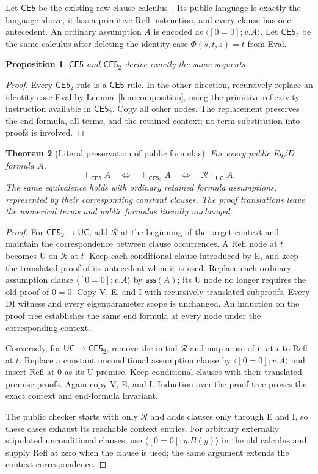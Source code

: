 \documentclass[11pt,letterpaper]{article}
\newtheorem{theorem}{Theorem}[section]
\newtheorem{proposition}[theorem]{Proposition}
\theoremstyle{definition}\newtheorem{definition}[theorem]{Definition}
\newcommand{\UC}{\mathsf{UC}}
\newcommand{\CE}{\mathsf{CE5}}
\newcommand{\CEtwo}{\mathsf{CE5}_2}
\newcommand{\cl}[2]{\langle #1;#2\rangle}
\newcommand{\ass}[1]{\mathsf{ass}(#1)}
\begin{document}
Let $\CE$ be the existing raw clause calculus~\cite{raw}. Its public
language is exactly the language above, it has a primitive Refl instruction,
and every clause has one antecedent. An ordinary assumption $A$ is encoded
as $\cl{[0=0]}{v.A}$. Let $\CEtwo$ be the same calculus after deleting
the identity case $\Phi(s,t,s)=t$ from Eval.

\begin{proposition}
$\CE$ and $\CEtwo$ derive exactly the same sequents.
\end{proposition}
\begin{proof}
Every $\CEtwo$ rule is a $\CE$ rule. In the other direction, recursively
replace an identity-case Eval by Lemma~\ref{lem:composition}, using the
primitive reflexivity instruction available in $\CEtwo$. Copy all other
nodes. The replacement preserves the end formula, all terms, and the
retained context; no term substitution into proofs is involved.
\end{proof}

\begin{theorem}[Literal preservation of public formulas]
\label{thm:local}
For every public Eq/$D$ formula $A$,
\[
 \vdash_{\CE}A\quad\Longleftrightarrow\quad
 \vdash_{\CEtwo}A\quad\Longleftrightarrow\quad
 \mathcal R\vdash_{\UC}A.
\]
The same equivalence holds with ordinary retained formula assumptions,
represented by their corresponding constant clauses. The proof translations
leave the numerical terms and public formulas literally unchanged.
\end{theorem}
\begin{proof}
For $\CEtwo\to\UC$, add $\mathcal R$ at the beginning of the target
context and maintain the correspondence between clause occurrences.
A Refl node at $t$ becomes U on $\mathcal R$ at $t$.
Keep each conditional clause introduced by E, and keep the translated
proof of its antecedent when it is used. Replace each ordinary-assumption
clause $\cl{[0=0]}{v.A}$ by $\ass A$; its U node no longer requires
the old proof of $0=0$. Copy V, E, and I with recursively translated
subproofs. Every DI witness and every eigenparameter scope is unchanged.
An induction on the proof tree establishes the same end formula at every
node under the corresponding context.

Conversely, for $\UC\to\CEtwo$, remove the initial $\mathcal R$ and
map a use of it at $t$ to Refl at $t$. Replace a constant unconditional
assumption clause by $\cl{[0=0]}{v.A}$ and insert Refl at $0$ as its
U premise. Keep conditional clauses with their translated premise proofs.
Again copy V, E, and I. Induction over the proof tree proves the exact
context and end-formula invariant.

The public checker starts with only $\mathcal R$ and adds clauses only
through E and I, so these cases exhaust its reachable context entries.
For arbitrary externally stipulated unconditional clauses, use
$\cl{[0=0]}{y.B(y)}$ in the old calculus and supply Refl at zero when
the clause is used; the same argument extends the context correspondence.
\end{proof}
\end{document}
